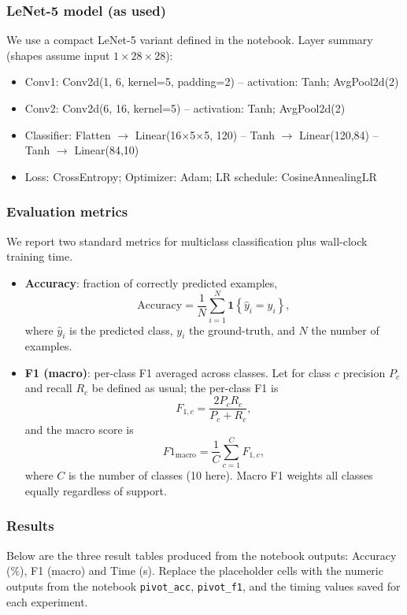 \subsubsection{LeNet-5 model (as used)}
We use a compact LeNet-5 variant defined in the notebook. Layer summary (shapes assume input $1\times28\times28$):
\begin{itemize}
        \item Conv1: Conv2d(1, 6, kernel=5, padding=2) -- activation: Tanh; AvgPool2d(2)
        \item Conv2: Conv2d(6, 16, kernel=5) -- activation: Tanh; AvgPool2d(2)
        \item Classifier: Flatten $\rightarrow$ Linear(16$\times$5$\times$5, 120) -- Tanh $\rightarrow$ Linear(120,84) -- Tanh $\rightarrow$ Linear(84,10)
        \item Loss: CrossEntropy; Optimizer: Adam; LR schedule: CosineAnnealingLR
\end{itemize}

\subsubsection{Evaluation metrics}
We report two standard metrics for multiclass classification plus wall-clock training time.
\begin{itemize}
    \item \textbf{Accuracy}: fraction of correctly predicted examples,
    $$\mathrm{Accuracy} = \frac{1}{N}\sum_{i=1}^N \mathbf{1}\!\left\{\hat{y}_i = y_i\right\},$$
    where $\hat{y}_i$ is the predicted class, $y_i$ the ground-truth, and $N$ the number of examples.
    \item \textbf{F1 (macro)}: per-class F1 averaged across classes. Let for class $c$ precision $P_c$ and recall $R_c$ be defined as usual; the per-class F1 is
    $$F_{1,c} = \frac{2P_c R_c}{P_c + R_c},$$
    and the macro score is
    $$F1_{\text{macro}} = \frac{1}{C} \sum_{c=1}^C F_{1,c},$$
    where $C$ is the number of classes (10 here). Macro F1 weights all classes equally regardless of support.
\end{itemize}

\subsubsection{Results}
Below are the three result tables produced from the notebook outputs: Accuracy (\%), F1 (macro) and Time (s). Replace the placeholder cells with the numeric outputs from the notebook \texttt{pivot\_acc}, \texttt{pivot\_f1}, and the timing values saved for each experiment.

